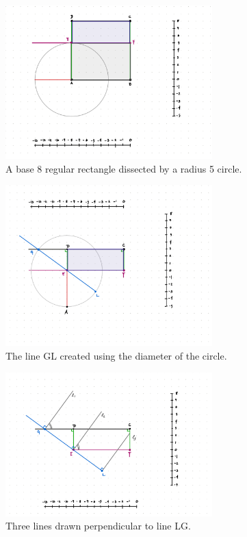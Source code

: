 \documentclass{article}
\begin{document}
\begin{figure}[ht]
    \centering
    \includegraphics[width=8cm]{Capstone Presentation/Draft Diagrams/1.png}
    
    \caption{A base 8 regular rectangle dissected by a radius 5 circle.} 
    \label{Fig_Step_1}
\end{figure}

\begin{figure}[ht]
    \centering
    \includegraphics[width=8cm]{Capstone Presentation/Draft Diagrams/2.png}
    \caption{The line GL created using the diameter of the circle.}
     \label{Fig_Step_2}
\end{figure}

\begin{figure}[ht]
    \centering
    \includegraphics[width=8cm]{Capstone Presentation/Draft Diagrams/3.png}
    \caption{Three lines drawn perpendicular to line LG.}
     \label{Fig_Step_3}
\end{figure}
\end{document}
